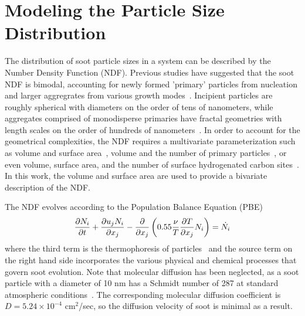 \section{Modeling the Particle Size Distribution}
\label{sec:subfilter:ndf}

The distribution of soot particle sizes in a system can be described by the Number Density Function (NDF). Previous studies have suggested that the soot NDF is bimodal, accounting for newly formed 'primary' particles from nucleation and larger aggregrates from various growth modes~\cite{zhao2003,zhao2005,netzell2007}. Incipient particles are roughly spherical with diameters on the order of tens of nanometers, while aggregates comprised of monodisperse primaries have fractal geometries with length scales on the order of hundreds of nanometers~\cite{vanderwal1999}. In order to account for the geometrical complexities, the NDF requires a multivariate parameterization such as volume and surface area~\cite{FILL IN}, volume and the number of primary particles~\cite{FILL IN}, or even volume, surface area, and the number of surface hydrogenated carbon sites~\cite{FILL IN}. In this work, the volume and surface area are used to provide a bivariate description of the NDF. 

The NDF evolves according to the Population Balance Equation (PBE)~\cite{friedlander2000}
\begin{equation}\label{eq:ndf:pbe}
  \tder{N_i} - \pder[]{x_j}\left( 0.55\frac{\nu}{T}\pder[T]{x_j}N_i \right) = \dot{N_i}
\end{equation}
where the third term is the thermophoresis of particles~\cite{waldmann1966} and the source term on the right hand side incorporates the various physical and chemical processes that govern soot evolution. Note that molecular diffusion has been neglected, as a soot particle with a diameter of 10 nm has a Schmidt number of 287 at standard atmospheric conditions~\cite{friedlander2000}. The corresponding molecular diffusion coefficient is $D = 5.24\times 10^{-4}$ cm$^2$/sec, so the diffusion velocity of soot is minimal as a result.
